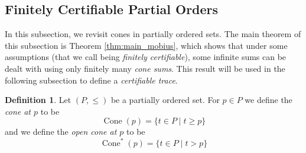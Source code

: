 \documentclass{memo-l}
\theoremstyle{plain}
\theoremstyle{definition}
\numberwithin{section}{chapter}
\numberwithin{equation}{chapter}
\newcommand{\prob}[2]{{\Prob}_{#1}{\left[\; #2\; \right]}}
\DeclareMathOperator{\HasTangle}{HasTangle}
\newcommand{\HasTanglemin}{\Tangle_{r,B}^{\min}}
\newcommand{\tanglefree}{{\mathrm{TF}(r,B)}}
\DeclareMathOperator{\Prob}{Prob}
\DeclareMathOperator{\Cone}{Cone}
\DeclareMathOperator{\Tangle}{Tangle}
\newcommand{\taufund}{\tau_{\mathrm{fund}}}
\theoremstyle{plain}
\newtheorem{cor}[theorem]{Corollary}
\theoremstyle{definition}
\newtheorem{defn}[theorem]{Definition}
\newcommand\cC{\mathcal{C}}
\begin{document}
% 
% 
%
%
%
%
\subsection{Finitely Certifiable Partial Orders}
\label{sb:certifiable}

In this subsection, we revisit cones in partially ordered sets. The main
theorem of this subsection is Theorem \ref{thm:main_mobius}, which shows that
under some assumptions (that we call being \emph{finitely certifiable}),
some infinite sums can be dealt with using only finitely many \emph{cone
sums}. This result will be used in the following subsection to define a
\emph{certifiable trace}.

\begin{defn} Let \( (P,\leq) \) be a partially ordered set. For \( p \in P
\) we define the \emph{cone at \(p\)} to be \[ \Cone(p) = \{ t \in P \mid t
\geq p \} \] and we define the \emph{open cone at \(p\)} to be \[
\Cone^\ast(p) = \{ t \in P \mid t > p \} \] \end{defn}
\end{document}
